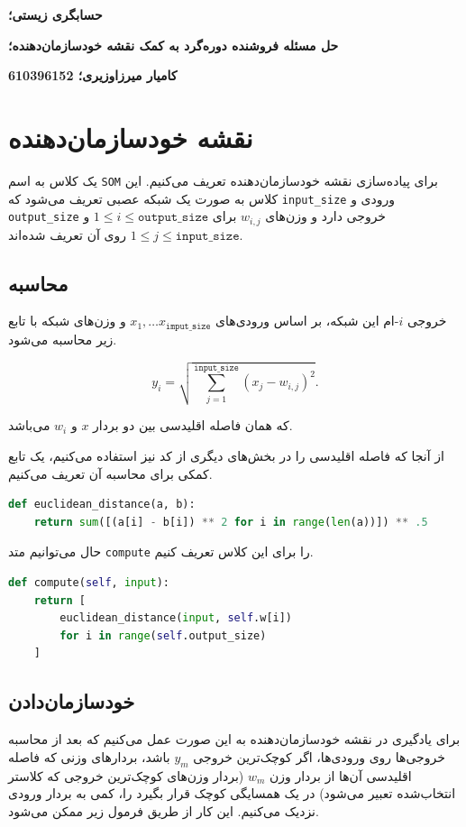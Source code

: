 \documentclass[a4paper, 12pt]{article}
\theoremstyle{definition}
\begin{document}
\textbf{حسابگری زیستی؛}

\textbf{حل مسئله فروشنده دوره‌گرد به کمک نقشه خودسازمان‌دهنده؛}

\textbf{کامیار میرزاوزیری؛ 610396152}

\hrulefill

\section{نقشه خودسازمان‌دهنده}

یک کلاس به اسم
\texttt{SOM}
برای پیاده‌سازی نقشه خودسازمان‌دهنده تعریف می‌کنیم. این کلاس به صورت یک شبکه عصبی تعریف می‌شود که
\texttt{input\_size}
ورودی و
\texttt{output\_size}
خروجی دارد و وزن‌های
$w_{i, j}$
برای
$1 \leq i \leq \texttt{output\_size}$
و
$1 \leq j \leq \texttt{input\_size}$
روی آن تعریف شده‌اند.

\subsection{محاسبه}
خروجی
$i$-ام
این شبکه، بر اساس ورودی‌های
$x_1, \dots x_\texttt{imput\_size}$
و وزن‌های شبکه با تابع زیر محاسبه می‌شود.

\[ y_i = \sqrt{\sum_{j=1}^{\texttt{input\_size}} (x_j - w_{i, j})^2}. \]

که همان فاصله اقلیدسی بین دو بردار
$x$
و
$w_i$
می‌باشد.

از آنجا که فاصله اقلیدسی را در بخش‌های دیگری از کد نیز استفاده می‌کنیم، یک تابع کمکی برای محاسبه آن تعریف می‌کنیم.

\LTR
\begin{lstlisting}[language=Python]
def euclidean_distance(a, b):
    return sum([(a[i] - b[i]) ** 2 for i in range(len(a))]) ** .5
\end{lstlisting}
\RTL

حال می‌توانیم متد
\texttt{compute}
را برای این کلاس تعریف کنیم.

\LTR
\begin{lstlisting}[language=Python]
def compute(self, input):
    return [
        euclidean_distance(input, self.w[i])
        for i in range(self.output_size)
    ]
\end{lstlisting}
\RTL

\subsection{خودسازمان‌دادن}
برای یادگیری در نقشه خودسازمان‌دهنده به این صورت عمل می‌کنیم که بعد از محاسبه خروجی‌ها روی ورودی‌ها، اگر کوچک‌ترین خروجی
$y_m$
باشد، بردارهای وزنی که فاصله اقلیدسی آن‌ها از بردار وزن
$w_m$
(بردار وزن‌های کوچک‌ترین خروجی که کلاستر انتخاب‌شده تعبیر می‌شود)
در یک همسایگی کوچک قرار بگیرد را، کمی به بردار ورودی نزدیک می‌کنیم. این کار از طریق فرمول زیر ممکن می‌شود.
\end{document}
